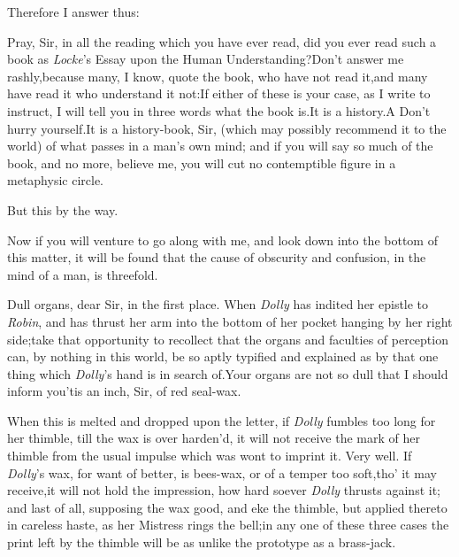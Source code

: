 \documentclass{article}
\begin{document}
\tsh Therefore I answer thus:

Pray, Sir, in all the reading which you have ever read, did you
ever read such a book as \textit{Locke}’s Essay upon the Human
Understanding?\tsh Don’t answer me rashly,\tsk because many, I
know, quote the book, who have not read it,\tsk and many have
read it who understand it not:\tsk If either of these is your
case, as I write to instruct, I will tell you in three words
what the book is.\tsk It is a history.\tsk A\break
{}
Don’t hurry yourself.\tsk It is a
history-book, Sir, (which may possibly recommend it to the
world) of what passes in a man’s own mind; and if you will say
so much of the book, and no more, believe me, you will cut no
contemptible figure in a metaphysic circle.

But this by the way.

Now if you will venture to go along with me, and look down into
the bottom of this matter, it will be found that the cause of
obscurity and confusion, in the mind of a man, is threefold.

Dull organs, dear Sir, in the first place. 
When \textit{Dolly} has indited her epistle to \textit{Robin},
and has thrust her arm into the bottom of her pocket hanging by
her right side;\tsk take that opportunity to recollect that the
organs and faculties of perception can, by nothing in this
world, be so aptly typified and explained as by that one thing
which \textit{Dolly}’s hand is in search of.\tsk Your organs are
not so dull that I should inform you\tsk ’tis an inch, Sir, of
red seal-wax.

When this is melted and dropped upon the letter, if \textit{Dolly}
fumbles too long for her thimble, till the wax is over harden’d, it
will not receive the mark of her thimble from the usual impulse
which was wont to imprint it. Very well. If \textit{Dolly}’s
wax, for want of better, is bees-wax, or of a temper too
soft,\tsk tho’ it may receive,\tsk it will not hold the
impression, how hard soever \textit{Dolly} thrusts against it; and
last of all, supposing the wax good, and eke the thimble, but
applied thereto in careless haste, as her Mistress rings the bell;\tsh in any one of
these three cases the print left by the thimble will be as unlike
the prototype as a brass-jack.
\end{document}

